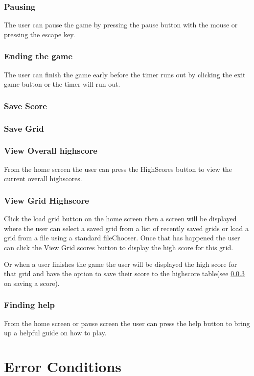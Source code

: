 \documentclass{project}
\begin{document}
			
		\subsubsection{Pausing} \label{Pausing}
		The user can pause the game by pressing the pause button with the mouse or pressing the escape key.
		\subsubsection{Ending the game} \label{Ending the game}
		The user can finish the game early before the timer runs out by clicking the exit game button or the timer will run out.
		\subsubsection{Save Score} \label{Save score}
		\subsubsection{Save Grid}	\label{Save grid}
		\subsubsection{View Overall highscore} \label{View Overall highscore}
		From the home screen the user can press the HighScores button to view the current overall highscores.
		\subsubsection{View Grid Highscore} \label{View Grid HigScore}
		Click the load grid button on the home screen then a screen will be displayed where the user can select a saved grid from a list of recently saved grids or load a grid from a file using a standard fileChooser. Once that has happened the user can click the View Grid scores button to display the high score for this grid.
		
		Or when a user finishes the game the user will be displayed the high score for that grid and have the option to save their score to the highscore table(see \ref{Save score}  on saving a score).
		\subsubsection{Finding help} \label{Finding help}
		From the home screen or pause screen the user can press the help button to bring up a helpful guide on how to play.
		
\section{Error Conditions}
\end{document}
